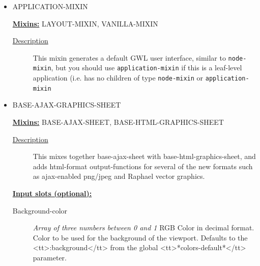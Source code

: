 \documentclass [11pt]{book}
\begin{document}
\begin{itemize}

\item {}APPLICATION-MIXIN


\textbf{
\underline{Mixins:}} LAYOUT-MIXIN, VANILLA-MIXIN





\begin{description}

\item [
\underline{Description}]


This mixin generates a default GWL user interface, similar to \texttt{node-mixin}, but you should use
\texttt{application-mixin} if this is a leaf-level application (i.e. has no children of type \texttt{node-mixin}
or \texttt{application-mixin}



\end{description}









\item {}BASE-AJAX-GRAPHICS-SHEET


\textbf{
\underline{Mixins:}} BASE-AJAX-SHEET, BASE-HTML-GRAPHICS-SHEET





\begin{description}

\item [
\underline{Description}]


This mixes together base-ajax-sheet 
with base-html-graphics-sheet, and adds html-format output-functions 
for several of the new formats such as ajax-enabled png/jpeg and 
Raphael vector graphics.



\end{description}








\textbf{
\underline{Input slots (optional):}}

\begin{description}

\item [Background-color]
\emph{Array of three numbers between 0 and 1} RGB Color in decimal
format. Color to be used for the background of the viewport.
Defaults to the
<tt>:background</tt> from the global <tt>*colors-default*</tt> parameter.



\end{description}
\end{itemize}
\end{document}
